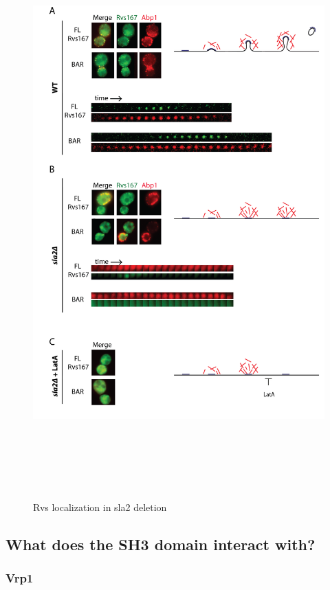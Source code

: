 \begin{figure}
	\centering
\includegraphics[width=22cm,height=22cm,keepaspectratio]{figures/results_final/sla2_del_final3}
	\caption{Rvs localization in sla2 deletion\label{fig2_sla2del}}
\end{figure}

	\subsection{What does the SH3 domain interact with?}
		\subsubsection{Vrp1}
